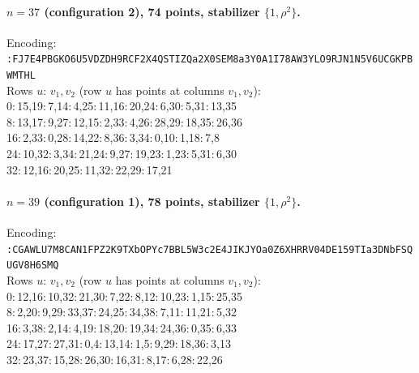 \paragraph{$n=37$ (configuration 2), 74 points, stabilizer $\{1,\rho^2\}$.} Encoding:\\
{\small \texttt{:FJ7E4PBGKO6U5VDZDH9RCF2X4QSTI\allowbreak ZQa2X0SEM8a3Y0A1I78AW3YLO9RJN1\allowbreak N5V6UCGKPBWMTHL}}\\
Rows $u:\,v_1,v_2$ (row $u$ has points at columns $v_1,v_2$):\\
{\small
  0:\,15,19:\,7,14:\,4,25:\,11,16:\,20,24:\,6,30:\,5,31:\,13,35 \\
  8:\,13,17:\,9,27:\,12,15:\,2,33:\,4,26:\,28,29:\,18,35:\,26,36 \\
  16:\,2,33:\,0,28:\,14,22:\,8,36:\,3,34:\,0,10:\,1,18:\,7,8 \\
  24:\,10,32:\,3,34:\,21,24:\,9,27:\,19,23:\,1,23:\,5,31:\,6,30 \\
  32:\,12,16:\,20,25:\,11,32:\,22,29:\,17,21
}

\paragraph{$n=39$ (configuration 1), 78 points, stabilizer $\{1,\rho^2\}$.} Encoding:\\
{\small \texttt{:CGAWLU7M8CAN1FPZ2K9TXbOPYc7BB\allowbreak L5W3c2E4JIKJYOa0Z6XHRRV04DE159\allowbreak TIa3DNbFSQUGV8H6SMQ}}\\
Rows $u:\,v_1,v_2$ (row $u$ has points at columns $v_1,v_2$):\\
{\small
  0:\,12,16:\,10,32:\,21,30:\,7,22:\,8,12:\,10,23:\,1,15:\,25,35 \\
  8:\,2,20:\,9,29:\,33,37:\,24,25:\,34,38:\,7,11:\,11,21:\,5,32 \\
  16:\,3,38:\,2,14:\,4,19:\,18,20:\,19,34:\,24,36:\,0,35:\,6,33 \\
  24:\,17,27:\,27,31:\,0,4:\,13,14:\,1,5:\,9,29:\,18,36:\,3,13 \\
  32:\,23,37:\,15,28:\,26,30:\,16,31:\,8,17:\,6,28:\,22,26
}

